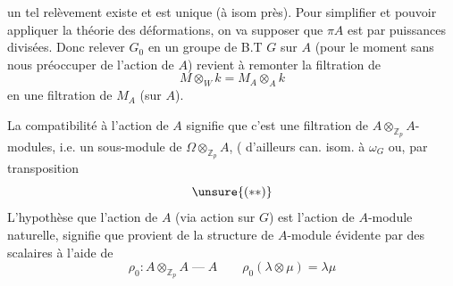 un tel relèvement existe et est unique (à isom  près).  Pour simplifier et pouvoir appliquer la théorie des déformations, on va supposer que $\pi A$ est  par puissances divisées. Donc relever $G_0$ en un groupe de B.T $G$ sur $A$ (pour le moment sans nous préoccuper de l'action de $A$) revient à remonter la filtration de
\[
M\otimes_W k=M_A\otimes_A k
\]
en une filtration de $M_A$ (sur $A$).


La compatibilité à l'action de $A$ signifie que c'est une filtration de $A\otimes_{\mathbb Z_p}A$-modules, i.e. un sous-module   de $\Omega\otimes_{\mathbb Z_p}A$, (  d'ailleurs can. isom. à $\omega_G$
ou, par transposition
\[
\unsure{(**)}
\]
L'hypothèse que l'action de $A$  (via action sur $G$) est l'action de $A$-module naturelle, signifie que    provient de la structure de $A$-module  évidente par  des scalaires à l'aide de
\[
\rho_0:A\otimes_{\mathbb Z_p}A\mathrel{\text{---}}A\qquad\rho_0(\lambda\otimes\mu)=\lambda\mu
\]

